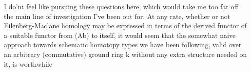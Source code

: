 I do'nt feel like pursuing these questions here, which would take me
too far off the main line of investigation I've been out for. At any rate,
whether or not Eilenberg-Maclane homology may be expressed in terms of
the   derived functor of a suitable functor from (Ab) to itself, it
would seem that the somewhat naive approach towards schematic homotopy
types we have been following, valid over an arbitrary (commutative)
ground ring k without any extra structure needed on it, is worthwhile

